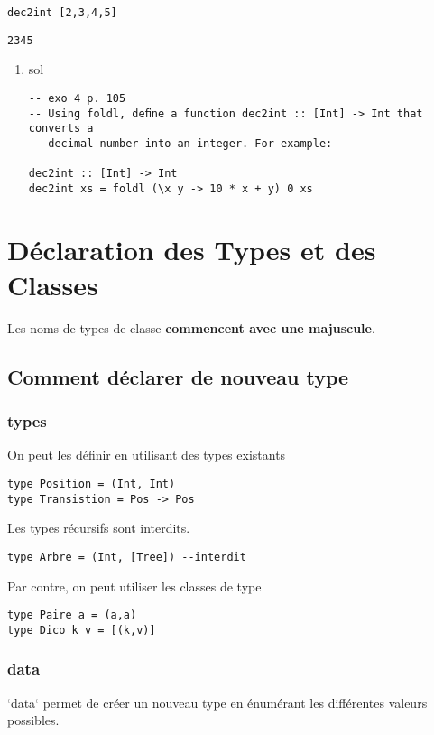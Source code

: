 \documentclass[11pt]{article}
\begin{document}
\begin{verbatim}
dec2int [2,3,4,5]
\end{verbatim}
\begin{verbatim}
2345
\end{verbatim}

\begin{enumerate}
\item sol
\label{sec:org864334d}
\begin{verbatim}
-- exo 4 p. 105
-- Using foldl, deﬁne a function dec2int :: [Int] -> Int that converts a
-- decimal number into an integer. For example:

dec2int :: [Int] -> Int
dec2int xs = foldl (\x y -> 10 * x + y) 0 xs

\end{verbatim}
\end{enumerate}
\section{Déclaration des Types et des Classes}
\label{sec:org9209bac}
Les noms de types de classe \textbf{commencent avec une majuscule}.

\subsection{Comment déclarer de nouveau type}
\label{sec:org42d8661}
\subsubsection{types}
\label{sec:org4343605}
On peut les définir en utilisant des types existants
\begin{verbatim}
type Position = (Int, Int)
type Transistion = Pos -> Pos
\end{verbatim}

Les types récursifs sont interdits.
\begin{verbatim}
type Arbre = (Int, [Tree]) --interdit
\end{verbatim}

Par contre, on peut utiliser les classes de type
\begin{verbatim}
type Paire a = (a,a)
type Dico k v = [(k,v)]
\end{verbatim}
\subsubsection{data}
\label{sec:org39d9e6b}
`data` permet de créer un nouveau type en énumérant les différentes valeurs possibles.
\end{document}
